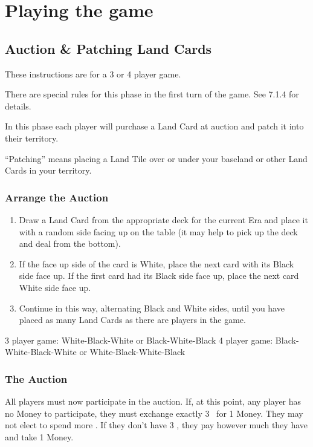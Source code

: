 \documentclass[10pt,twocolumn]{article}
\begin{document}
\section{Playing the game}
\subsection{Auction \& Patching Land Cards}
These instructions are for a 3 or 4 player game.

There are special rules for this phase in the first turn of the game. See 7.1.4 for details.

In this phase each player will purchase a Land Card at auction and patch it into their territory.

``Patching'' means placing a Land Tile over or under your baseland or other Land Cards in your territory.

\subsubsection{Arrange the Auction}
\begin{enumerate}
\item Draw a Land Card from the appropriate deck for the current Era and place it with a random side facing up on the table (it may help to pick up the deck and deal from the bottom).
\item If the face up side of the card is White, place the next card with its Black side face up. If the first card had its Black side face up, place the next card White side face up.
\item Continue in this way, alternating Black and White sides, until you have placed as many Land Cards as there are players in the game.
\end{enumerate}
\begin{BoxExample}3 player game: White-Black-White or Black-White-Black
4 player game: Black-White-Black-White or White-Black-White-Black\end{BoxExample}


\subsubsection{The Auction}
All players must now participate in the auction. If, at this point, any player has no Money to participate, they must exchange exactly 3 \vps\ for 1 Money. They may not elect to spend more \vps. If they don't have 3 \vps, they pay however much they have and take 1 Money.
\end{document}
